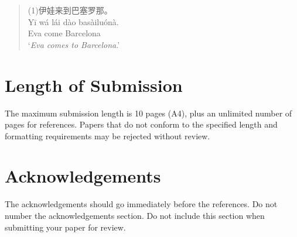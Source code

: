 \documentclass[11pt]{article}
\begin{document}
\begin{quote}
(1)\quad 伊娃来到巴塞罗那。\\
\qquad Y\={i} w\'{a} l\'{a}i d\`{a}o bas\`{a}ilu\'{o}n\`{a}. \\
\qquad Eva \quad come \quad Barcelona \\
\qquad `\emph{Eva comes to Barcelona}.'
\end{quote}

\section{Length of Submission}
\label{sec:length}

The maximum submission length is 10 pages (A4), plus an unlimited number of pages for references. Papers that do not conform to the specified length and formatting requirements may be rejected without review.

\section*{Acknowledgements}

The acknowledgements should go immediately before the references. Do not number the acknowledgements section. Do not include this section when submitting your paper for review.

%
%
\end{document}
